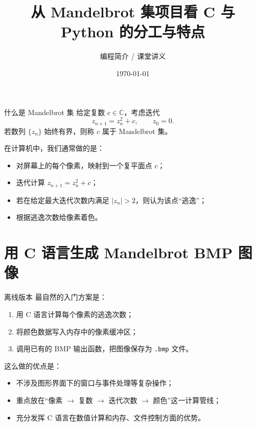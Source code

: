 \documentclass[aspectratio=169,11pt]{ctexbeamer}
\title{从 Mandelbrot 集项目看 C 与 Python 的分工与特点}
\author{编程简介 / 课堂讲义}
\date{\today}
\begin{document}
\begin{frame}
  \titlepage
\end{frame}


\begin{frame}{什么是 Mandelbrot 集}
给定复数 $c \in \mathbb{C}$，考虑迭代
\[
z_{n+1} = z_n^2 + c, \qquad z_0 = 0.
\]
若数列 $\{z_n\}$ 始终有界，则称 $c$ 属于 Mandelbrot 集。

\vspace{0.5em}
在计算机中，我们通常做的是：

\begin{itemize}
  \item 对屏幕上的每个像素，映射到一个复平面点 $c$；
  \item 迭代计算 $z_{n+1} = z_n^2 + c$；
  \item 若在给定最大迭代次数内满足 $|z_n| > 2$，则认为该点“逃逸”；
  \item 根据逃逸次数给像素着色。
\end{itemize}
\end{frame}


\section{用 C 语言生成 Mandelbrot BMP 图像}

\begin{frame}{离线版本}
最自然的入门方案是：

\begin{enumerate}
  \item 用 C 语言计算每个像素的逃逸次数；
  \item 将颜色数据写入内存中的像素缓冲区；
  \item 调用已有的 BMP 输出函数，把图像保存为 \texttt{.bmp} 文件。
\end{enumerate}

\vspace{0.5em}
这么做的优点是：

\begin{itemize}
  \item 不涉及图形界面下的窗口与事件处理等复杂操作；
  \item 重点放在“像素 $\to$ 复数 $\to$ 迭代次数 $\to$ 颜色”这一计算管线；
  \item 充分发挥 C 语言在数值计算和内存、文件控制方面的优势。
\end{itemize}
\end{frame}
\end{document}
